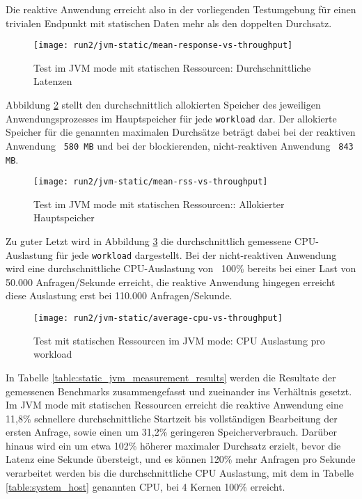 Die reaktive Anwendung erreicht also in der vorliegenden Testumgebung für einen trivialen
Endpunkt mit statischen Daten mehr als den doppelten Durchsatz.
\newpage
\begin{figure}[ht!]
    \texttt{[image: run2/jvm-static/mean-response-vs-throughput]}
    \caption{Test im JVM mode mit statischen Ressourcen: Durchschnittliche Latenzen}
    \label{fig:jvm_static_mean_response}
\end{figure}
Abbildung \ref{fig:jvm_static_mean_rss} stellt den durchschnittlich allokierten Speicher des jeweiligen Anwendungsprozesses
im Hauptspeicher für jede \verb|workload| dar. Der allokierte Speicher für die genannten maximalen Durchsätze beträgt dabei bei
der reaktiven Anwendung ~\verb|580 MB| und bei der blockierenden, nicht-reaktiven Anwendung ~\verb|843 MB|.
\newpage
\begin{figure}[ht!]
    \texttt{[image: run2/jvm-static/mean-rss-vs-throughput]}
    \caption{Test im JVM mode mit statischen Ressourcen:: Allokierter Hauptspeicher}
    \label{fig:jvm_static_mean_rss}
\end{figure}
Zu guter Letzt wird in Abbildung \ref{fig:jvm_static_avg_cpu} die durchschnittlich gemessene CPU-Auslastung für jede \verb|workload|
dargestellt. Bei der nicht-reaktiven Anwendung wird eine durchschnittliche CPU-Auslastung von ~100\% bereits bei einer Last von
50.000 Anfragen/Sekunde erreicht, die reaktive Anwendung hingegen erreicht diese Auslastung erst bei 110.000 Anfragen/Sekunde.
\newpage
\begin{figure}[ht!]
    \centering
    \texttt{[image: run2/jvm-static/average-cpu-vs-throughput]}
    \caption{Test mit statischen Ressourcen im JVM mode: CPU Auslastung pro workload}
    \label{fig:jvm_static_avg_cpu}
\end{figure}

In Tabelle \ref{table:static_jvm_measurement_results} werden die Resultate der gemessenen Benchmarks zusammengefasst
und zueinander ins Verhältnis gesetzt. Im JVM mode mit statischen Ressourcen erreicht die reaktive Anwendung
eine 11,8\% schnellere durchschnittliche Startzeit bis vollständigen Bearbeitung der ersten Anfrage, sowie
einen um 31,2\% geringeren Speicherverbrauch.
Darüber hinaus wird ein um etwa 102\% höherer maximaler Durchsatz erzielt, bevor die Latenz eine Sekunde übersteigt, und
es können 120\% mehr Anfragen pro Sekunde verarbeitet werden bis die durchschnittliche CPU Auslastung, mit dem in Tabelle
\ref{table:system_host} genannten CPU, bei 4 Kernen 100\% erreicht.

